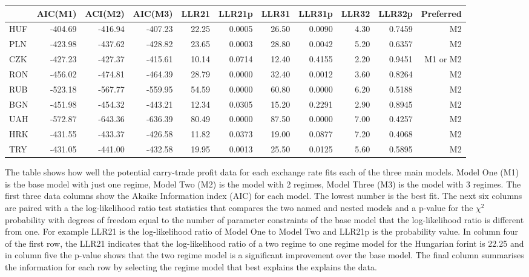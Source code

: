\documentclass[12pt, a4paper, oneside]{article}\usepackage[]{graphicx}\usepackage[]{color}
\begin{document}
\begin{sidewaystable}[p]
\begin{threeparttable}
\centering
\begin{tabular}{l|rrrrrrrrrr}
  \hline
 & AIC(M1) & ACI(M2) & AIC(M3) & LLR21 & LLR21p & LLR31 & LLR31p & LLR32 & LLR32p & Preferred\\ 
  \hline HUF & -404.69 & -416.94 & -407.23 & 22.25 & 0.0005 & 26.50 & 0.0090 & 4.30 & 0.7459 & M2\\  PLN & -423.98 & -437.62 & -428.82 & 23.65 & 0.0003 & 28.80 & 0.0042 & 5.20 & 0.6357 & M2\\  CZK & -427.23 & -427.37 & -415.61 & 10.14 & 0.0714 & 12.40 & 0.4155 & 2.20 & 0.9451 & M1 or M2\\  RON & -456.02 & -474.81 & -464.39 & 28.79 & 0.0000 & 32.40 & 0.0012 & 3.60 & 0.8264 & M2\\  RUB & -523.18 & -567.77 & -559.95 & 54.59 & 0.0000 & 60.80 & 0.0000 & 6.20 & 0.5188 & M2\\  BGN & -451.98 & -454.32 & -443.21 & 12.34 & 0.0305 & 15.20 & 0.2291 & 2.90 & 0.8945 & M2\\  UAH & -572.87 & -643.36 & -636.39 & 80.49 & 0.0000 & 87.50 & 0.0000 & 7.00 & 0.4257 & M2\\ 
  HRK & -431.55 & -433.37 & -426.58 & 11.82 & 0.0373 & 19.00 & 0.0877 & 7.20 & 0.4068 & M2\\ 
  TRY & -431.05 & -441.00 & -432.58 & 19.95 & 0.0013 & 25.50 & 0.0125 & 5.60 & 0.5895 & M2\\ 
   \hline
\end{tabular}
\begin{tablenotes}
\small
\item The table shows how well the potential carry-trade profit data for each exchange rate fits each of the three main models. Model One (M1) is the base model with just one regime, Model Two (M2) is the model with 2 regimes, Model Three (M3) is the model with 3 regimes.  The first three data columns show the Akaike Information index (AIC) for each model.  The lowest number is the best fit.  The next six columns are paired with a the log-likelihood ratio test statistics that compares the two named and nested models and a p-value for the $\chi^2$ probability with degrees of freedom equal to the number of parameter constraints of the base model that the log-likelihood ratio is different from one.  For example LLR21 is the log-likelihood ratio of Model One to Model Two and LLR21p is the probability value.  In column four of the first row, the LLR21 indicates that the log-likelihood ratio of a two regime to one regime model for the Hungarian forint is 22.25 and in column five the p-value shows that the two regime model is a significant improvement over the base model. The final column summarises the information for each row by selecting the regime model that best explains the explains the data.  

\end{tablenotes}
\end{threeparttable}
\end{sidewaystable}
\end{document}
